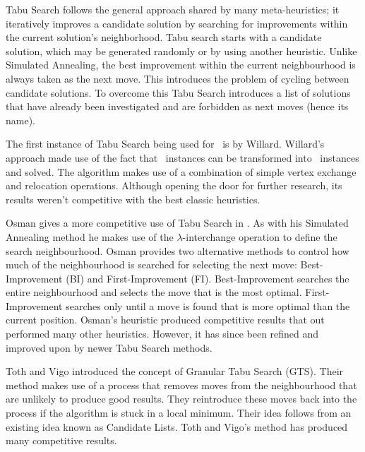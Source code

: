 Tabu Search follows the general approach shared by many meta-heuristics; it iteratively improves a candidate solution by searching for improvements within the current solution's neighborhood. Tabu search starts with a candidate solution, which may be generated randomly or by using another heuristic. Unlike Simulated Annealing, the best improvement within the current neighbourhood is always taken as the next move. This introduces the problem of cycling between candidate solutions. To overcome this Tabu Search introduces a list of solutions that have already been investigated and are forbidden as next moves (hence its name).

The first instance of Tabu Search being used for \VRP\ is by Willard\cite{Willard:1989}. Willard's approach made use of the fact that \VRP\ instances can be transformed into \MTSP\ instances and solved. The algorithm makes use of a combination of simple vertex exchange and relocation operations. Although opening the door for further research, its results weren't competitive with the best classic heuristics. 

Osman gives a more competitive use of Tabu Search in \cite{Osman:1993}. As with his Simulated Annealing method he makes use of the $\lambda$-interchange operation to define the search neighbourhood. Osman provides two alternative methods to control how much of the neighbourhood is searched for selecting the next move: Best-Improvement (BI) and First-Improvement (FI). Best-Improvement searches the entire neighbourhood and selects the move that is the most optimal. First-Improvement searches only until a move is found that is more optimal than the current position. Osman's heuristic produced competitive results that out performed many other heuristics. However, it has since been refined and improved upon by newer Tabu Search methods.

Toth and Vigo introduced the concept of Granular Tabu Search (GTS)\cite{GHL:1998}. Their method makes use of a process that removes moves from the neighbourhood that are unlikely to produce good results. They reintroduce these moves back into the process if the algorithm is stuck in a local minimum. Their idea follows from an existing idea known as Candidate Lists. Toth and Vigo's method has produced many competitive results.

